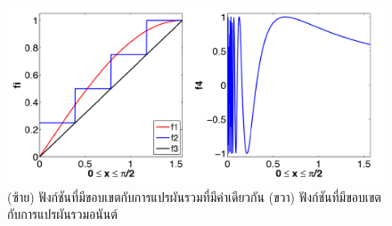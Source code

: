 \begin{figure}[H]
	\centering
	\includegraphics[width=0.8\linewidth]{image/boundary_condition/function_slove.png}
	\caption{(ซ้าย) ฟังก์ชันที่มีขอบเขตกับการแปรผันรวมที่มีค่าเดียวกัน (ขวา) ฟังก์ชันที่มีขอบเขตกับการแปรผันรวมอนันต์}
	\label{figure:sample-domain}
\end{figure}